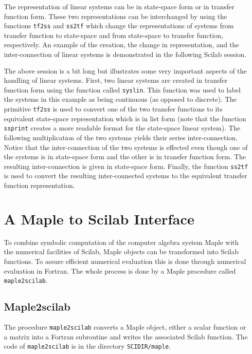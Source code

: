 	The representation of linear systems can be in state-space
form or in transfer function form.  These two representations can
be interchanged by using the functions 
{\tt tf2ss} and 
{\tt ss2tf}
which change the representations of systems from transfer function
to state-space and from state-space to transfer function, respectively.
An example of the creation, the change in representation, and the
inter-connection of linear systems is demonstrated in the following
Scilab session.



The above session is a bit long but illustrates some very important
aspects of the handling of linear systems.  First, two linear systems
are created in transfer function form using the function called 
{\tt syslin}.
This function was used to label the systems in this example 
as being continuous (as opposed to discrete).  
The primitive {\tt tf2ss} is used to convert one of the
two transfer functions to its equivalent state-space representation
which is in list form (note that the function {\tt ssprint} creates a more
readable format for the state-space linear system).
The following multiplication of the two systems yields their
series inter-connection.  Notice that the inter-connection 
of the two systems is effected even though one of the systems is
in state-space form and the other is in transfer function form.
The resulting inter-connection is given in state-space form.
Finally, the function {\tt ss2tf} is used to convert the resulting
inter-connected systems to the equivalent transfer function representation.


\chapter{A Maple to Scilab Interface}
To combine symbolic computation of the computer algebra system Maple with the 
numerical facilities
of Scilab, Maple objects can be transformed into Scilab functions. To assure 
efficient numerical evaluation this is done through numerical evaluation in 
Fortran. The whole process is done by a Maple procedure called 
\verb/maple2scilab/.
\section{Maple2scilab}
The procedure \verb!maple2scilab! converts a Maple object, 
either a scalar function or a matrix into a Fortran subroutine 
and writes the associated Scilab function. The code of \verb!maple2scilab!
is in the directory \verb!SCIDIR/maple!.

